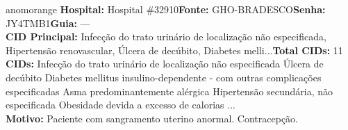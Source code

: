 \documentclass[a4paper,10pt]{article}
\begin{document}
\begin{anomalycard}[Interna\c{c}\~{a}o \#119499 | Pac. \#7414 | ALTO (z=4.70) | LOS: 6d | 26/02/2026\,$\to$\,04/03/2026]{anomorange}
\textbf{Hospital:} Hospital \#32910\quad \textbf{Fonte:} GHO-BRADESCO\quad \textbf{Senha:} JY4TMB1\quad \textbf{Guia:} ---\\

\textbf{CID Principal:} {\small Infecção do trato urinário de localização não especificada, Hipertensão renovascular, Úlcera de decúbito, Diabetes melli...}\quad\textbf{Total CIDs:} 11\\

\textbf{CIDs:} {\scriptsize Infecção do trato urinário de localização não especificada \textbar{} Úlcera de decúbito \textbar{} Diabetes mellitus insulino-dependente - com outras complicações especificadas \textbar{} Asma predominantemente alérgica \textbar{} Hipertensão secundária, não especificada \textbar{} Obesidade devida a excesso de calorias \textbar{} ...}\\

\textbf{Motivo:} {\scriptsize Paciente com sangramento uterino anormal. Contracepção.}\\




\end{anomalycard}
\end{document}

